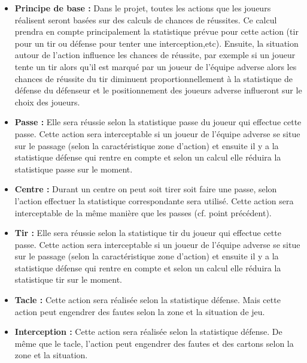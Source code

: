 \begin{itemize}
    \item \textbf{Principe de base :} Dans le projet, toutes les actions que les joueurs réalisent seront basées sur des calculs de chances de réussites. Ce calcul prendra en compte principalement la statistique prévue pour cette action (tir pour un tir ou défense pour tenter une interception,etc). Ensuite, la situation autour de l’action influence les chances de réussite, par exemple si un joueur tente un tir alors qu’il est marqué par un joueur de l'équipe adverse alors les chances de réussite du tir diminuent proportionnellement à la statistique de défense du défenseur et le positionnement des joueurs adverse influeront sur le choix des joueurs.

    \vspace{10pt}

    \item \textbf{Passe :} Elle sera réussie selon la statistique passe du joueur qui effectue cette passe. Cette action sera interceptable si un joueur de l’équipe adverse se situe sur le passage (selon la caractéristique zone d’action) et ensuite il y a la statistique défense qui rentre en compte et selon un calcul elle réduira la statistique passe sur le moment.

    \vspace{10pt}

    \item \textbf{Centre :} Durant un centre on peut soit tirer soit faire une passe, selon l’action effectuer la statistique correspondante sera utilisé. Cette action sera interceptable de la même manière que les passes (cf. point précédent).

    \vspace{10pt}

    \item \textbf{Tir :} Elle sera réussie selon la statistique tir du joueur qui effectue cette passe. Cette action sera interceptable si un joueur de l’équipe adverse se situe sur le passage (selon la caractéristique zone d’action) et ensuite il y a la statistique défense qui rentre en compte et selon un calcul elle réduira la statistique tir sur le moment.

    \vspace{10pt}

    \item \textbf{Tacle :} Cette action sera réalisée selon la statistique défense. Mais cette action peut engendrer des fautes selon la zone et la situation de jeu.

    \vspace{10pt}

    \item \textbf{Interception :} Cette action sera réalisée selon la statistique défense. De même que le tacle, l’action peut engendrer des fautes et des cartons selon la zone et la situation.
\end{itemize}

